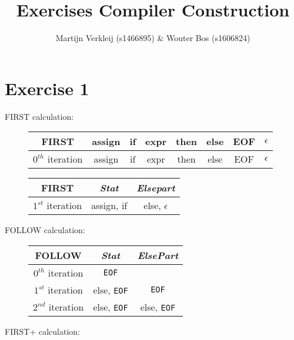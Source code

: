 \documentclass[11pt]{article} %
\title{Exercises Compiler Construction}
\author{Martijn Verkleij (s1466895) \& Wouter Bos (s1606824)}
\begin{document}
\maketitle

\section*{Exercise 1}
FIRST calculation:
\begin{figure}[H]
\begin{tabular}{|c|c|c|c|c|c|c|c|}\hline
\textbf{FIRST}     & assign & if & expr & then & else & EOF & $\epsilon$ \\\hline

$0^{th}$ iteration & assign & if & expr & then & else & EOF & $\epsilon$ \\\hline
\end{tabular}
\end{figure}

\begin{figure}[H]
\begin{tabular}{|c|c|c|}\hline
\textbf{FIRST}     & \textit{Stat}  & \textit{Elsepart} \\\hline

$1^{st}$ iteration & assign, if     & else, $\epsilon$  \\\hline
\end{tabular}
\end{figure}

\noindent FOLLOW calculation:

\begin{figure}[H]
\begin{tabular}{|c|c|c|}\hline
\textbf{FOLLOW}    & \textit{Stat}      & \textit{ElsePart}  \\\hline
$0^{th}$ iteration & \texttt{EOF}       &                    \\\hline
$1^{st}$ iteration & else, \texttt{EOF} & \texttt{EOF}       \\\hline
$2^{nd}$ iteration & else, \texttt{EOF} & else, \texttt{EOF} \\\hline
\end{tabular}
\end{figure}

\noindent FIRST+ calculation:
\end{document}
